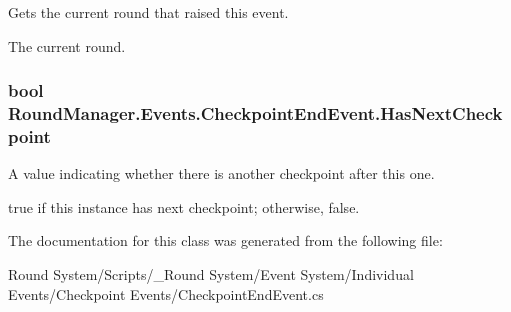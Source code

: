 Gets the current round that raised this event. 

The current round.\hypertarget{class_round_manager_1_1_events_1_1_checkpoint_end_event_a882ecd882a8c5c5824450d29c4d4e43f}{}
\subsubsection[{Has\+Next\+Checkpoint}]{\setlength{\rightskip}{0pt plus 5cm}bool Round\+Manager.\+Events.\+Checkpoint\+End\+Event.\+Has\+Next\+Checkpoint\hspace{0.3cm}{\ttfamily [get]}}\label{class_round_manager_1_1_events_1_1_checkpoint_end_event_a882ecd882a8c5c5824450d29c4d4e43f}


A value indicating whether there is another checkpoint after this one. 

{\ttfamily true} if this instance has next checkpoint; otherwise, {\ttfamily false}.

The documentation for this class was generated from the following file\+:\begin{DoxyCompactItemize}
\item 
Round System/\+Scripts/\+\_\+\+Round System/\+Event System/\+Individual Events/\+Checkpoint Events/Checkpoint\+End\+Event.\+cs\end{DoxyCompactItemize}
